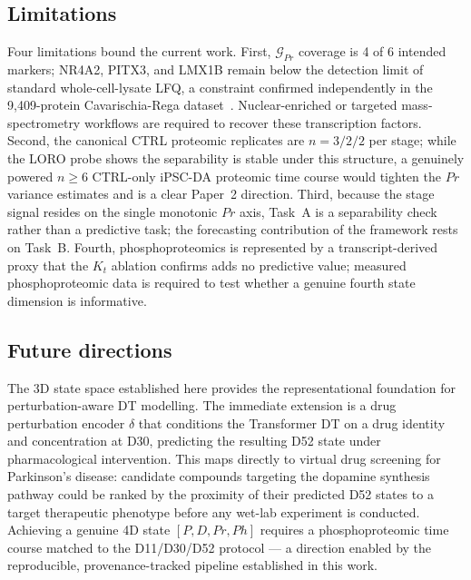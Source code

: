 \documentclass[5p,times,twocolumn]{elsarticle}
\begin{document}
\subsection{\textbf{Limitations}}

Four limitations bound the current work.
First, $\mathcal{G}_{Pr}$ coverage is 4 of 6 intended markers;
NR4A2, PITX3, and LMX1B remain below the detection limit of
standard whole-cell-lysate LFQ, a constraint confirmed
independently in the 9,409-protein Cavarischia-Rega
dataset~\cite{cavarischia2024proteome}.
Nuclear-enriched or targeted mass-spectrometry workflows are
required to recover these transcription factors.
Second, the canonical CTRL proteomic replicates are $n = 3/2/2$
per stage; while the LORO probe shows the separability is stable
under this structure, a genuinely powered $n \geq 6$ CTRL-only
iPSC-DA proteomic time course would tighten the $Pr$ variance
estimates and is a clear Paper~2 direction.
Third, because the stage signal resides on the single monotonic
$Pr$ axis, Task~A is a separability check rather than a
predictive task; the forecasting contribution of the framework
rests on Task~B.
Fourth, phosphoproteomics is represented by a transcript-derived
proxy that the $K_t$ ablation confirms adds no predictive value;
measured phosphoproteomic data is required to test whether a
genuine fourth state dimension is informative.

\subsection{\textbf{Future directions}}

The 3D state space established here provides the representational
foundation for perturbation-aware DT modelling.
The immediate extension is a drug perturbation encoder $\delta$
that conditions the Transformer DT on a drug identity and
concentration at D30, predicting the resulting D52 state under
pharmacological intervention.
This maps directly to virtual drug screening for Parkinson's
disease: candidate compounds targeting the dopamine synthesis
pathway could be ranked by the proximity of their predicted D52
states to a target therapeutic phenotype before any wet-lab
experiment is conducted.
Achieving a genuine 4D state $[P, D, Pr, Ph]$ requires a
phosphoproteomic time course matched to the D11/D30/D52
protocol --- a direction enabled by the reproducible,
provenance-tracked pipeline established in this work.



\end{document}
